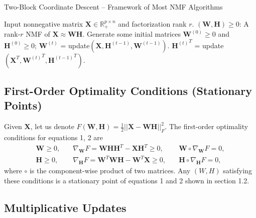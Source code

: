 \documentclass[11pt]{article}
\begin{document}
\FloatBarrier
\renewcommand{\thealgorithm}{BCD}
\begin{algorithm}[ht!]
\caption{Two-Block Coordinate Descent -- Framework of Most NMF Algorithms \label{nmfalgo}}
\begin{algorithmic}[1] 
\REQUIRE Input nonnegative matrix $\mathbf{X} \in \mathbb{R}^{p \times n}_+$ and factorization rank $r$. 
\ENSURE $(\mathbf{W,H}) \geq 0$: A rank-$r$ NMF of $\mathbf{X} \approx \mathbf{WH}$. 
    \medskip  
\STATE Generate some initial matrices $\mathbf{W}^{(0)} \geq 0$ and $\mathbf{H}^{(0)} \geq 0$; 
 \STATE  $\mathbf{W}^{(t)}$ = update$\left(\mathbf{X}, \mathbf{H}^{(t-1)}, \mathbf{W}^{(t-1)}\right)$. 
 \STATE  ${\mathbf{H}^{(t)}}^T$ = update$\left(\mathbf{X}^T,  {\mathbf{W}^{(t)}}^T, {\mathbf{H}^{(t-1)}}^T\right)$. 
\ENDFOR
\end{algorithmic}  
\end{algorithm} 
\FloatBarrier

\subsection{First-Order Optimality Conditions (Stationary Points)} 
Given $\mathbf{X}$, let us denote $F(\mathbf{W,H}) = \frac{1}{2}||\mathbf{X-WH}||_F^2$. The first-order optimality conditions for equations 1, 2 are
\begin{eqnarray}  
\mathbf{W} \geq 0, & \quad \nabla_{\mathbf{W}} F = \mathbf{WHH}^T - \mathbf{XH}^T \geq 0, & \quad \mathbf{W} \circ \nabla_{\mathbf{W}} F = 0, \label{kktc} \\
 \mathbf{H} \geq 0, & \quad \nabla_{\mathbf{H}} F = \mathbf{W}^T\mathbf{WH} - \mathbf{W}^T\mathbf{X} \geq 0, & \quad \mathbf{H} \circ \nabla_{\mathbf{H}} F = 0, \nonumber 
\end{eqnarray}
where $\circ$ is the component-wise product of two matrices. 
Any $(W,H)$ satisfying these conditions is a stationary point of equations 1 and 2 shown in section 1.2. 

\subsection{Multiplicative Updates} \label{mu}
\end{document}
